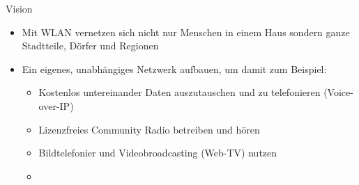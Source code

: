 \documentclass[aspectratio=43]{beamer}
\begin{document}
\begin{frame}{Vision}
	\begin{itemize}
		\item Mit WLAN vernetzen sich nicht nur Menschen in einem Haus sondern ganze Stadtteile, Dörfer und Regionen %
		\item Ein eigenes, unabhängiges Netzwerk aufbauen, um damit zum Beispiel:
		\begin{itemize}
			\item Kostenlos untereinander Daten auszutauschen und zu telefonieren (Voice-over-IP)
			\item Lizenzfreies Community Radio betreiben und hören
			\item Bildtelefonier und Videobroadcasting (Web-TV) nutzen %
			\item <deine Idee hier> %
		\end{itemize}
	\end{itemize}
\end{frame}
\end{document}
